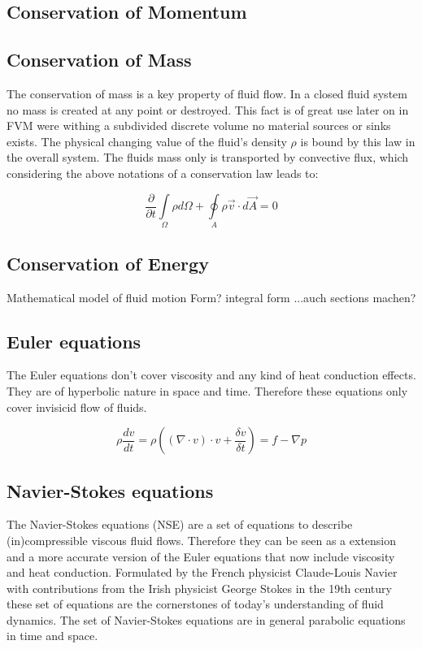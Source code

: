  

\subsection{Conservation of Momentum}



\subsection{Conservation of Mass}

The conservation of mass is a key property of fluid flow. In a closed fluid system
no mass is created at any point or destroyed. This fact is of great use later on in FVM were withing a subdivided discrete volume no material sources or sinks exists.
The physical changing value of the fluid's density $\rho$ is bound by this law in the overall system. The fluids mass only is transported by convective flux, which considering the above notations of a conservation law leads to:

\begin{equation}\label{eq:con_mass_1}
\frac {\partial}{\partial t} \int\limits_{\Omega} \rho d \Omega +
\oint\limits_{A} \rho \vec{v} \cdot d \vec{A} = 0
\end{equation}



\subsection{Conservation of Energy}





Mathematical model of fluid motion
Form? integral form ...auch sections machen?

\subsection{Euler equations}
The Euler equations don't cover viscosity and any kind of heat conduction effects. They are of hyperbolic nature in space and time. Therefore these equations only cover invisicid flow of fluids.

\begin{equation}
\rho \frac{dv}{dt} = 
\rho ((\nabla \cdot v)\cdot v + \frac {\delta v}{\delta t }) =
f - \nabla p 
\end{equation}


\subsection{Navier-Stokes equations}
\label{sec:NSE_main}
The Navier-Stokes equations (NSE) are a set of equations to describe (in)compressible
viscous fluid flows. Therefore they can be seen as a extension and a more accurate version of the Euler equations that now include viscosity and heat conduction. Formulated by the French physicist Claude-Louis Navier with contributions from the Irish physicist George Stokes in the 19th century these set of equations are the cornerstones of today's understanding of fluid dynamics. The set of Navier-Stokes equations are in general parabolic equations in time and space. 

